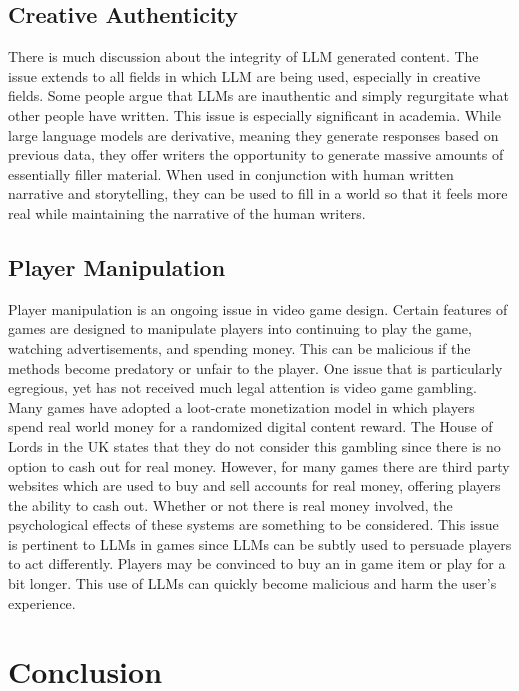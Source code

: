 \documentclass[10pt,twocolumn]{article}
\begin{document}
    \subsection{Creative Authenticity}

        \par 
        There is much discussion about the integrity of LLM generated content. The issue extends to all fields in which LLM are being used, especially in creative fields. Some people argue that LLMs are inauthentic and simply regurgitate what other people have written. This issue is especially significant in academia\cite{academic_integrity}\cite{academic_integrity2}. While large language models are derivative, meaning they generate responses based on previous data, they offer writers the opportunity to generate massive amounts of essentially filler material. When used in conjunction with human written narrative and storytelling, they can be used to fill in a world so that it feels more real while maintaining the narrative of the human writers. 
    \subsection{Player Manipulation}

        \par
        Player manipulation is an ongoing issue in video game design. Certain features of games are designed to manipulate players into continuing to play the game, watching advertisements, and spending money. This can be malicious if the methods become predatory or unfair to the player. One issue that is particularly egregious, yet has not received much legal attention is video game gambling. Many games have adopted a loot-crate monetization model in which players spend real world money for a randomized digital content reward. The House of Lords in the UK states that they do not consider this gambling since there is no option to cash out for real money\cite{loot_boxes}. However, for many games there are third party websites which are used to buy and sell accounts for real money, offering players the ability to cash out. Whether or not there is real money involved, the psychological effects of these systems are something to be considered. This issue is pertinent to LLMs in games since LLMs can be subtly used to persuade players to act differently. Players may be convinced to buy an in game item or play for a bit longer. This use of LLMs can quickly become malicious and harm the user's experience. 

\section{Conclusion}

    \par 
    

\printbibliography
\end{document}
